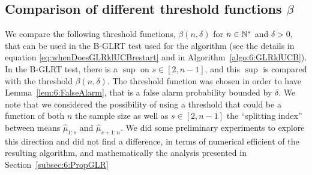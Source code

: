 \subsection{Comparison of different threshold functions $\beta$}\label{sec:6:exploringDifferentThresholdFunctions}

%

We compare the following threshold functions, $\beta(n,\delta)$ for $n\in\mathbb{N}^*$ and $\delta>0$, that can be used in the B-GLRT test used for the \GLRklUCB{} algorithm (see the details in equation \eqref{eq:whenDoesGLRklUCBrestart} and in Algorithm~\ref{algo:6:GLRklUCB}).
%
In the B-GLRT test, there is a $\sup$ on $s\in[2,n-1]$, and this $\sup$ is compared with the threshold $\beta(n,\delta)$. The threshold function was chosen in order to have Lemma~\ref{lem:6:FalseAlarm}, that is a false alarm probability bounded by $\delta$.
We note that we considered the possibility of using a threshold that could be a function of both $n$ the sample size as well as $s\in[2,n-1]$ the ``splitting index'' between means $\widehat{\mu}_{1:s}$ and $\widehat{\mu}_{s+1:n}$.
We did some preliminary experiments to explore this direction and did not find a difference, in terms of numerical efficient of the resulting \GLRklUCB{} algorithm, and mathematically the analysis presented in Section~\ref{subsec:6:PropGLR}

